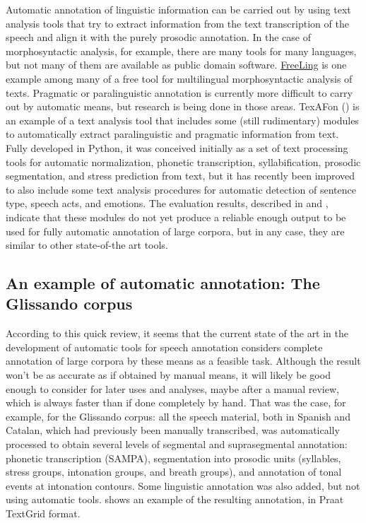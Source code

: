 \documentclass[output=paper]{langsci/langscibook}
\begin{document}
Automatic annotation of linguistic information can be carried out by using text analysis tools that try to extract information from the text transcription of the speech and align it with the purely prosodic annotation. In the case of morphosyntactic analysis, for example, there are many tools for many languages, but not many of them are available as public domain software. \href{http://nlp.lsi.upc.edu/freeling/}{FreeLing} \citep{Carreras2004} is one example among many of a free tool for multilingual morphosyntactic analysis of texts. Pragmatic or paralinguistic annotation is currently more difficult to carry out by automatic means, but research is being done in those areas. TexAFon (\citealt{Garrido2014}) is an example of a text analysis tool that includes some (still rudimentary) modules to automatically extract paralinguistic and pragmatic information from text. Fully developed in Python, it was conceived initially as a set of text processing tools for automatic normalization, phonetic transcription, syllabification, prosodic segmentation, and stress prediction from text, but it has recently been improved to also include some text analysis procedures for automatic detection of sentence type, speech acts, and emotions. The evaluation results, described in \citet{Garrido2014} and \citet{Kolz2014}, indicate that these modules do not yet produce a reliable enough output to be used for fully automatic annotation of large corpora, but in any case, they are similar to other state-of-the art tools.

\subsection{An example of automatic annotation: The Glissando corpus}

According to this quick review, it seems that the current state of the art in the development of automatic tools for speech annotation considers complete annotation of large corpora by these means as a feasible task. Although the result won’t be as accurate as if obtained by manual means, it will likely be good enough to consider for later uses and analyses, maybe after a manual review, which is always faster than if done completely by hand. That was the case, for example, for the Glissando corpus: all the speech material, both in Spanish and Catalan, which had previously been manually transcribed, was automatically processed to obtain several levels of segmental and suprasegmental annotation: phonetic transcription (SAMPA), segmentation into prosodic units (syllables, stress groups, intonation groups, and breath groups), and annotation of tonal events at intonation contours. Some linguistic annotation was also added, but not using automatic tools.  shows an example of the resulting annotation, in Praat TextGrid format.
\end{document}
